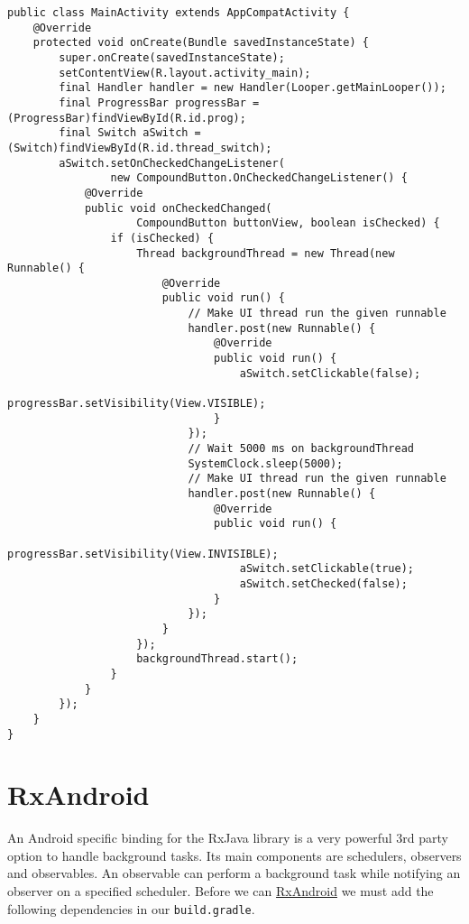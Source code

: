 \begin{lstlisting}[style=A_Java,caption={Background job with a thread and communication to UI thread with a handler},label={listing:layoutprg}]
public class MainActivity extends AppCompatActivity {
    @Override
    protected void onCreate(Bundle savedInstanceState) {
        super.onCreate(savedInstanceState);
        setContentView(R.layout.activity_main);
        final Handler handler = new Handler(Looper.getMainLooper());
        final ProgressBar progressBar = (ProgressBar)findViewById(R.id.prog);
        final Switch aSwitch = (Switch)findViewById(R.id.thread_switch);
        aSwitch.setOnCheckedChangeListener(
                new CompoundButton.OnCheckedChangeListener() {
            @Override
            public void onCheckedChanged(
                    CompoundButton buttonView, boolean isChecked) {
                if (isChecked) {
                    Thread backgroundThread = new Thread(new Runnable() {
                        @Override
                        public void run() {
                            // Make UI thread run the given runnable
                            handler.post(new Runnable() {
                                @Override
                                public void run() {
                                    aSwitch.setClickable(false);
                                    progressBar.setVisibility(View.VISIBLE);
                                }
                            });
                            // Wait 5000 ms on backgroundThread
                            SystemClock.sleep(5000);
                            // Make UI thread run the given runnable
                            handler.post(new Runnable() {
                                @Override
                                public void run() {
                                    progressBar.setVisibility(View.INVISIBLE);
                                    aSwitch.setClickable(true);
                                    aSwitch.setChecked(false);
                                }
                            });
                        }
                    });
                    backgroundThread.start();
                }
            }
        });
    }
}
\end{lstlisting}

\section{RxAndroid}
An Android specific binding for the RxJava library is a very powerful 3rd party option to handle background tasks. Its main components are schedulers, observers and observables. An observable can perform a background task while notifying an observer on a specified scheduler. Before we can \href{https://github.com/ReactiveX/RxAndroid}{RxAndroid} we must add the following dependencies in our \texttt{build.gradle}.

